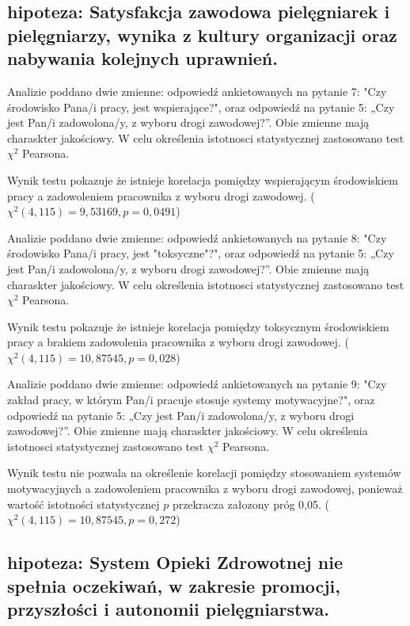 \documentclass[a4paper,12pt,twoside,openany]{report}
\begin{document}
\subsection*{hipoteza: Satysfakcja zawodowa pielęgniarek i pielęgniarzy, wynika z kultury organizacji oraz nabywania kolejnych uprawnień.}

Analizie poddano dwie zmienne: odpowiedź ankietowanych na pytanie 7: "Czy  środowisko  Pana/i pracy, jest wspierające?", oraz odpowiedź na pytanie 5: „Czy jest Pan/i zadowolona/y, z wyboru drogi zawodowej?”. Obie zmienne mają charaskter jakościowy. W celu określenia istotnosci statystycznej zastosowano test $\chi^2$ Pearsona.

Wynik testu pokazuje że istnieje korelacja pomiędzy wspierającym środowiskiem pracy a zadowoleniem pracownika z wyboru drogi zawodowej. ($\chi^2 (4, 115) = 9,53169, p=0,0491$)

\vspace{\baselineskip}

Analizie poddano dwie zmienne: odpowiedź ankietowanych na pytanie 8: "Czy  środowisko  Pana/i pracy, jest "toksyczne"?", oraz odpowiedź na pytanie 5: „Czy jest Pan/i zadowolona/y, z wyboru drogi zawodowej?”. Obie zmienne mają charaskter jakościowy. W celu określenia istotnosci statystycznej zastosowano test $\chi^2$ Pearsona.

Wynik testu pokazuje że istnieje korelacja pomiędzy toksycznym środowiskiem pracy a brakiem zadowolenia pracownika z wyboru drogi zawodowej. ($\chi^2 (4, 115) = 10,87545, p=0,028$)

\vspace{\baselineskip}
Analizie poddano dwie zmienne: odpowiedź ankietowanych na pytanie 9: "Czy zakład pracy, w którym Pan/i pracuje stosuje systemy motywacyjne?", oraz odpowiedź na pytanie 5: „Czy jest Pan/i zadowolona/y, z wyboru drogi zawodowej?”. Obie zmienne mają charaskter jakościowy. W celu określenia istotnosci statystycznej zastosowano test $\chi^2$ Pearsona.

Wynik testu nie pozwala na określenie korelacji pomiędzy stosowaniem systemów motywacyjnych a zadowoleniem pracownika z wyboru drogi zawodowej, ponieważ wartość istotności statystycznej $p$ przekracza załozony próg 0,05. ($\chi^2 (4, 115) = 10,87545, p=0,272$)

\vspace{\baselineskip} 

\subsection*{hipoteza: System Opieki Zdrowotnej nie spełnia oczekiwań, w zakresie promocji, przyszłości i autonomii pielęgniarstwa.}
\end{document}
